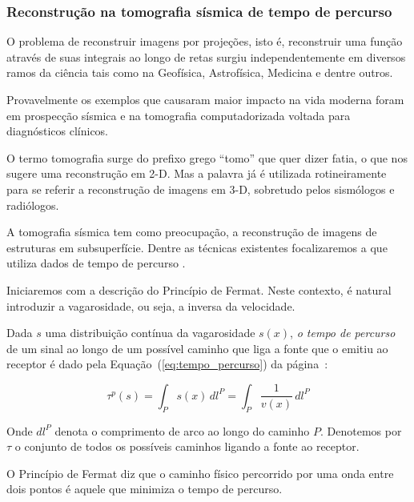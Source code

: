 \documentclass[a4paper, 12 pt]{article} %
\begin{document}
\subsubsection{Reconstrução na tomografia sísmica de tempo de percurso}

O problema de reconstruir imagens por projeções, isto é, reconstruir uma função através de suas integrais ao longo de retas surgiu independentemente em diversos ramos da ciência tais como na Geofísica, Astrofísica, Medicina e dentre
outros. 

Provavelmente os exemplos que causaram maior impacto na vida moderna foram em prospecção sísmica e na tomografia computadorizada voltada para diagnósticos clínicos.

O termo tomografia surge do prefixo grego ``tomo'' que quer dizer fatia, o que nos sugere uma reconstrução em 2-D. Mas a palavra já é utilizada rotineiramente para se referir a reconstrução de imagens em 3-D, sobretudo pelos sismólogos e radiólogos.

A tomografia sísmica tem como preocupação, a reconstrução de imagens de estruturas em subsuperfície. Dentre as técnicas existentes focalizaremos a que utiliza dados de tempo de percurso \citep{tempopercurso}.

Iniciaremos com a descrição do Princípio de Fermat. Neste contexto, é natural introduzir a vagarosidade, ou seja, a inversa da velocidade.

Dada $s$ uma distribuição contínua da vagarosidade $s(x)$, \textit{o tempo de percurso} de um sinal ao longo de um possível caminho que liga a fonte que o emitiu ao receptor é dado pela Equação~(\ref{eq:tempo_percurso}) da página~\pageref{eq:tempo_percurso}:


\begin{equation}\label{eq:tempo_percurso}
\tau^p(s) = \int_P s(x) \, dl^P = \int_P \frac{1}{v(x)} \, dl^P
\end{equation}


Onde $dl^P$ denota o comprimento de arco ao longo do caminho $P$. Denotemos por $\tau$ o conjunto de todos os possíveis caminhos ligando a fonte ao receptor.

O Princípio de Fermat diz que o caminho físico percorrido por uma onda entre dois pontos é aquele que minimiza o tempo de percurso.

\end{document}
